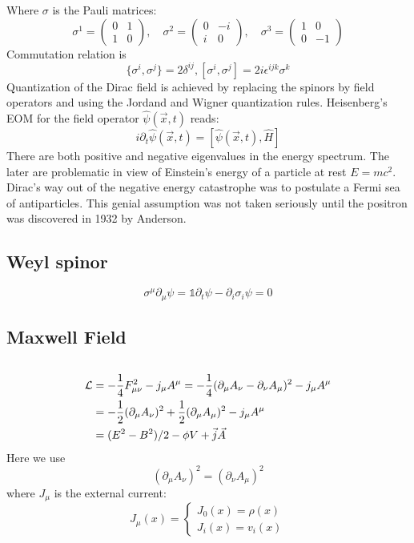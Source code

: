 Where \textbf{$\sigma$} is the Pauli matrices:
\begin{equation}
    \sigma^{1} = 
	\begin{pmatrix}
	    0	& 1 \\
	    1	& 0 
	\end{pmatrix},	\quad
    \sigma^{2} = 
	\begin{pmatrix}
	    0	& -i \\
	    i	& 0 
	\end{pmatrix},	\quad
    \sigma^{3} = 
	\begin{pmatrix}
	    1	& 0 \\
	    0	& -1 
	\end{pmatrix}
    \label{Pauli Matrices}
\end{equation}
Commutation relation is
\[
    \{\sigma^i, \sigma^j\} = 2\delta^{ij}, 
    [\sigma^i, \sigma^j] = 2i\epsilon^{ijk}\sigma^k
    \]
Quantization of the Dirac field is achieved by replacing the spinors by
field operators and using the Jordand and Wigner quantization rules.
Heisenberg's EOM for the field operator $\hat{\psi}(\vec{x}, t)$
reads:
$$ i\partial_{t}\hat{\psi}(\vec{x}, t) = [
    \hat{\psi}(\vec{x}, t), \hat{H}]$$
There are both positive and negative eigenvalues in the energy spectrum. The
later are problematic in view of Einstein’s energy of a particle at rest 
$ E = mc^2 $. Dirac’s way out of the negative energy catastrophe was to 
postulate a Fermi sea of antiparticles. This genial assumption was not 
taken seriously until the positron was discovered in 1932 by Anderson.

\subsection{Weyl spinor}
\[
    \sigma^\mu\partial_\mu\psi=\mathds{1}\partial_t\psi-\partial_i\sigma_i\psi=0
    \]

\subsection{Maxwell Field}
\begin{equation}
    \label{Maxwell Eqn}
\end{equation}

\[ 
\begin{aligned}
    \mathcal{L} &= -\frac{1}{4}F^2_{\mu\nu} - j_{\mu}A^{\mu} 
    =-\frac{1}{4}(\partial_{\mu}A_\nu-\partial_{\nu}A_\mu)^2-j_{\mu}A^{\mu}\\
    &=-\frac{1}{2}(\partial_{\mu}A_\nu)^2+\frac{1}{2}(\partial_{\mu}A_\mu)^2-j_{\mu}A^{\mu}\\
    &=(E^2 - B^2)/2 - \phi V + \vec{j}\vec{A} 
\end{aligned}
    \]
Here we use
\[
    (\partial_{\mu}A_\nu)^2=(\partial_{\nu}A_\mu)^2
    \]
where $J_\mu$ is the external current:
\[ J_\mu(x) = \left\{ 
\begin{aligned}
    J_0(x) = \rho(x) \\
    J_i(x) = v_i(x)
\end{aligned}
\right.\]

